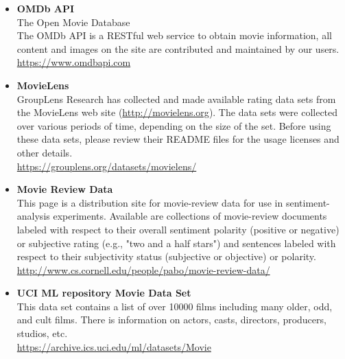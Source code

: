 \documentclass[11pt]{article}
\begin{document}
    \begin{itemize}

        \item \textbf{OMDb API} \\
        The Open Movie Database \\
        The OMDb API is a RESTful web service to obtain movie information, all content and images on the site are contributed and maintained by our users. \\
        \url{https://www.omdbapi.com}

        \item \textbf{MovieLens} \\
        GroupLens Research has collected and made available rating data sets from the MovieLens web site (\url{http://movielens.org}).
        The data sets were collected over various periods of time, depending on the size of the set.
        Before using these data sets, please review their README files for the usage licenses and other details. \\
        \url{https://grouplens.org/datasets/movielens/}

        \item \textbf{Movie Review Data} \\
        This page is a distribution site for movie-review data for use in sentiment-analysis experiments.
        Available are collections of movie-review documents labeled with respect to their overall sentiment polarity (positive or negative) or subjective rating (e.g., "two and a half stars") and sentences labeled with respect to their subjectivity status (subjective or objective) or polarity. \\
        \url{http://www.cs.cornell.edu/people/pabo/movie-review-data/}

        \item \textbf{UCI ML repository Movie Data Set} \\
        This data set contains a list of over 10000 films including many older, odd, and cult films.
        There is information on actors, casts, directors, producers, studios, etc. \\
        \url{https://archive.ics.uci.edu/ml/datasets/Movie}

    \end{itemize}
\end{document}

